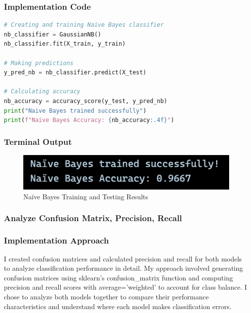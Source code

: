 \documentclass[12pt,a4paper]{article}
\begin{document}
\newpage
\subsubsection{Implementation Code}
\begin{lstlisting}[language=Python, caption=Use Naive Bayes to Classify Data]
# Creating and training Naive Bayes classifier
nb_classifier = GaussianNB()
nb_classifier.fit(X_train, y_train)

# Making predictions
y_pred_nb = nb_classifier.predict(X_test)

# Calculating accuracy
nb_accuracy = accuracy_score(y_test, y_pred_nb)
print("Naive Bayes trained successfully")
print(f"Naive Bayes Accuracy: {nb_accuracy:.4f}")
\end{lstlisting}

\subsubsection{Terminal Output}

\begin{figure}[h!]
    \centering
    \includegraphics[width=\textwidth]{Figures/NBTrain.png}
    \caption{Na\"{i}ve Bayes Training and Testing Results}
\end{figure}

\subsubsection{Analyze Confusion Matrix, Precision, Recall}

\subsubsection{Implementation Approach}
I created confusion matrices and calculated precision and recall for both models to analyze classification performance in detail. My approach involved generating confusion matrices using sklearn's confusion\_matrix function and computing precision and recall scores with average='weighted' to account for class balance. I chose to analyze both models together to compare their performance characteristics and understand where each model makes classification errors.
\end{document}
